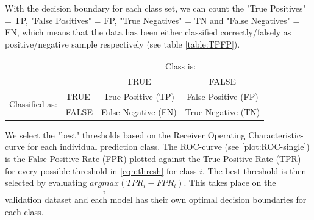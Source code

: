 With the decision boundary for each class set, we can count the "True Positives" = TP, "False Positives" = FP, "True Negatives" = TN and "False Negatives" = FN, which means that the data has been either classified correctly/falsely as positive/negative sample respectively (see table \ref{table:TPFP}). 
\begin{center}
	\begin{tabular}{ l l | c  c }
		& & \multicolumn{2}{c}{Class is:} \\
		& & TRUE & FALSE\\
		\hline
		\multirow{2}{4em}{Classified as:} & TRUE & True Positive (TP) & False Positive (FP) \\
		& FALSE & False Negative (FN) & True Negative (TN) \\
	\end{tabular}
	\label{table:TPFP}
\end{center}
We select the "best" thresholds based on the Receiver Operating Characteristic-curve for each individual prediction class. The ROC-curve (see \autoref{plot:ROC-single}) is the False Positive Rate (FPR) plotted against the True Positive Rate (TPR) for every possible threshold in \autoref{eqn:thresh} for class $i$. The best threshold is then selected by evaluating $\underset{i}{argmax}(TPR_i-FPR_i)$. This takes place on the validation dataset and each model has their own optimal decision boundaries for each class.
